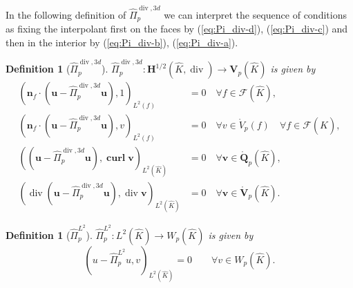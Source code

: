 \documentclass{article}
\newtheorem{definition}[theorem]{Definition}
\newcommand{\hatPidivcom}{\widehat\Pi^{\operatorname*{div},3d}_{p}}
\begin{document}
In the following definition of $\hatPidivcom$ we can interpret the sequence of conditions 
as fixing 
the interpolant first on the faces by (\ref{eq:Pi_div-d}), (\ref{eq:Pi_div-c}) 
and then in the interior by (\ref{eq:Pi_div-b}), (\ref{eq:Pi_div-a}). 
\begin{definition}[$\hatPidivcom$]
\label{def:hatPidivcom}
$\hatPidivcom:\mathbf{H}%
^{1/2}(\widehat{K},\operatorname*{div})\rightarrow\mathbf{V}_{p}(\widehat{K})$
is given by
\begin{subequations}
\label{eq:Pi_div}
\begin{align}
(\mathbf{n}_{f}\cdot(\mathbf{u}-\hatPidivcom\mathbf{u}),1)_{L^{2}(f)}  &  =0\quad\forall f\in{\mathcal{F}}%
(\widehat{K}), 
\label{eq:Pi_div-d}\\
(\mathbf{n}_{f}\cdot(\mathbf{u}-\hatPidivcom\mathbf{u}),{v})_{L^{2}(f)}  &  =0\quad\forall v\in\mathring{V}_{p}%
(f)\quad\forall f\in{\mathcal{F}}(\widehat{K}),
\label{eq:Pi_div-c}\\
((\mathbf{u}-\hatPidivcom\mathbf{u}%
),\operatorname*{\mathbf{curl}}\mathbf{v})_{L^{2}(\widehat{K})}  &  =0\quad
\forall\mathbf{v}\in\mathring{\mathbf{Q}}_{p}(\widehat{K}),
\label{eq:Pi_div-b}\\
(\operatorname*{div}(\mathbf{u}-\hatPidivcom\mathbf{u}),\operatorname*{div}\mathbf{v})_{L^{2}(\widehat{K})}  &
=0\quad\forall\mathbf{v}\in\mathring{\mathbf{V}}_{p}(\widehat{K}).
\label{eq:Pi_div-a}
\end{align}
\end{subequations}
\end{definition}

\begin{definition}[$\widehat{\Pi}_p^{L^2}$]
$\widehat{\Pi}_p^{L^{2}}:L^{2}(\widehat{K}) \rightarrow
W_{p}(\widehat{K})$ is given by 
\begin{equation}
\label{eq:Pi_L^2}(u - \widehat{\Pi}_p^{L^{2}} u,v)_{L^{2}(\widehat{K})} = 0
\qquad\forall v \in W_{p}(\widehat{K}).
\end{equation}
\end{definition}

\end{document}
